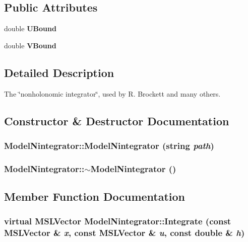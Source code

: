 \subsection*{Public Attributes}
\begin{CompactItemize}
\item 
double {\bf UBound}
\item 
double {\bf VBound}
\end{CompactItemize}


\subsection{Detailed Description}
The \char`\"{}nonholonomic integrator\char`\"{}, used by R. Brockett and many others.



\subsection{Constructor \& Destructor Documentation}
\subsubsection{\setlength{\rightskip}{0pt plus 5cm}Model\-Nintegrator::Model\-Nintegrator (string {\em path})}\label{class_ModelNintegrator_a0}


\subsubsection{\setlength{\rightskip}{0pt plus 5cm}Model\-Nintegrator::$\sim$Model\-Nintegrator ()\hspace{0.3cm}{\tt  [inline, virtual]}}\label{class_ModelNintegrator_a1}




\subsection{Member Function Documentation}
\subsubsection{\setlength{\rightskip}{0pt plus 5cm}virtual {\bf MSLVector} Model\-Nintegrator::Integrate (const {\bf MSLVector} \& {\em x}, const {\bf MSLVector} \& {\em u}, const double \& {\em h})\hspace{0.3cm}{\tt  [virtual]}}\label{class_ModelNintegrator_a3}


